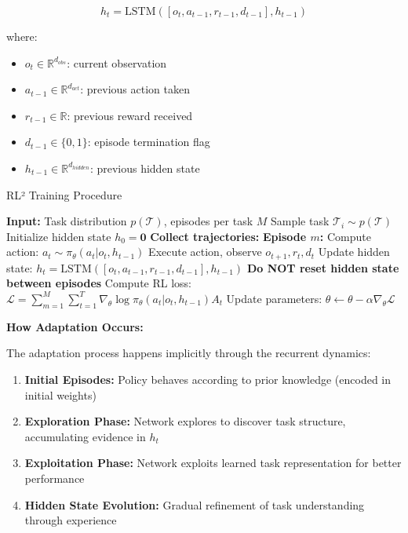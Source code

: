 \documentclass[12pt]{article}
\newcommand{\ieee}[1]{\textcolor{IEEEBlue}{\textbf{#1}}}
\begin{document}
{{			\begin{equation}
			h_t = \text{LSTM}([o_t, a_{t-1}, r_{t-1}, d_{t-1}], h_{t-1})
			\end{equation}
			
			where:
			\begin{itemize}
				\item $o_t \in \mathbb{R}^{d_{obs}}$: current observation
				\item $a_{t-1} \in \mathbb{R}^{d_{act}}$: previous action taken
				\item $r_{t-1} \in \mathbb{R}$: previous reward received
				\item $d_{t-1} \in \{0, 1\}$: episode termination flag
				\item $h_{t-1} \in \mathbb{R}^{d_{hidden}}$: previous hidden state
			\end{itemize}
			
			\begin{algorithm}[H]
			\caption{RL² Training Procedure}
			\begin{algorithmic}[1]
			\STATE \textbf{Input:} Task distribution $p(\mathcal{T})$, episodes per task $M$
			\STATE Sample task $\mathcal{T}_i \sim p(\mathcal{T})$
			\STATE Initialize hidden state $h_0 = \mathbf{0}$
			\STATE \textbf{Collect trajectories:}
			\STATE \textbf{Episode $m$:}
			\STATE Compute action: $a_t \sim \pi_\theta(a_t | o_t, h_{t-1})$
			\STATE Execute action, observe $o_{t+1}, r_t, d_t$
			\STATE Update hidden state: $h_t = \text{LSTM}([o_t, a_{t-1}, r_{t-1}, d_{t-1}], h_{t-1})$
			\ENDFOR
			\STATE \textbf{Do NOT reset hidden state between episodes}
			\ENDFOR
			\STATE Compute RL loss: $\mathcal{L} = \sum_{m=1}^M \sum_{t=1}^T \nabla_\theta \log \pi_\theta(a_t | o_t, h_{t-1}) A_t$
			\STATE Update parameters: $\theta \leftarrow \theta - \alpha \nabla_\theta \mathcal{L}$
			\ENDWHILE
			\end{algorithmic}
			\end{algorithm}
			
			\ieee{How Adaptation Occurs:}
			
			The adaptation process happens implicitly through the recurrent dynamics:
			
			\begin{enumerate}
				\item \textbf{Initial Episodes:} Policy behaves according to prior knowledge (encoded in initial weights)
				\item \textbf{Exploration Phase:} Network explores to discover task structure, accumulating evidence in $h_t$
				\item \textbf{Exploitation Phase:} Network exploits learned task representation for better performance
				\item \textbf{Hidden State Evolution:} Gradual refinement of task understanding through experience
			\end{enumerate}
			
}}
\end{document}
